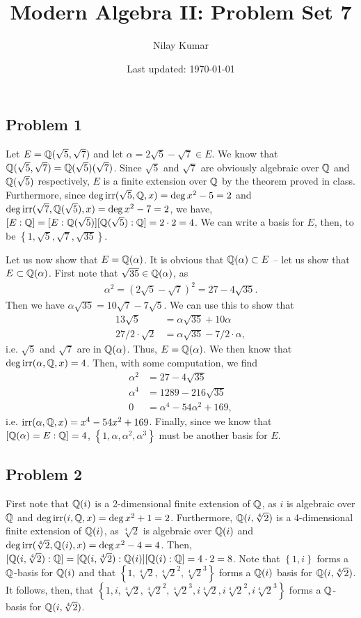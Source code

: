 \documentclass{../../mathnotes}
\title{Modern Algebra II: Problem Set 7}
\author{Nilay Kumar}
\date{Last updated: \today}
\begin{document}
\maketitle

\subsection*{Problem 1}

Let $E=\mathbb{Q}(\sqrt{5},\sqrt{7})$ and let $\alpha=2\sqrt{5}-\sqrt{7}\in E$. We know that $\mathbb{Q}(\sqrt{5},\sqrt{7})=\mathbb{Q}(\sqrt{5})(\sqrt{7})$.
Since $\sqrt{5}$ and $\sqrt{7}$ are obviously algebraic over $\mathbb{Q}$ and $\mathbb{Q}(\sqrt{5})$ respectively, $E$ is a finite extension over
$\mathbb{Q}$ by the theorem proved in class. Furthermore, since $\deg\operatorname{irr}(\sqrt{5},\mathbb{Q},x)=\deg x^2-5=2$ and $\deg\operatorname{irr}(\sqrt{7},\mathbb{Q}(\sqrt{5}),x)=\deg x^2-7=2$,
we have, $[E:\mathbb{Q}]=[E:\mathbb{Q}(\sqrt{5})][\mathbb{Q}(\sqrt{5}):\mathbb{Q}]=2\cdot2=4$. We can write a basis for $E$, then, to be $\left\{1,\sqrt{5},\sqrt{7},\sqrt{35}\right\}$.

Let us now show that $E=\mathbb{Q}(\alpha)$. It is obvious that $\mathbb{Q}(\alpha)\subset E$ -- let us show that $E\subset \mathbb{Q}(\alpha)$. First note that
$\sqrt{35}\in\mathbb{Q}(\alpha)$, as
\begin{align*}
    \alpha^2=(2\sqrt{5}-\sqrt{7})^2=27-4\sqrt{35}.
\end{align*}
Then we have $\alpha\sqrt{35}=10\sqrt{7}-7\sqrt{5}$. We can use this to show that
\begin{align*}
    13\sqrt{5}&=\alpha\sqrt{35}+10\alpha\\
    27/2\cdot\sqrt{2}&=\alpha\sqrt{35}-7/2\cdot\alpha,
\end{align*}
i.e. $\sqrt{5}$ and $\sqrt{7}$ are in $\mathbb{Q}(\alpha)$. Thus, $E=\mathbb{Q}(\alpha)$. We then know that $\deg\operatorname{irr}(\alpha,\mathbb{Q},x)=4$. Then, with some computation,
we find
\begin{align*}
    \alpha^2&=27-4\sqrt{35}\\
    \alpha^4&=1289-216\sqrt{35}\\
    0&=\alpha^4-54\alpha^2+169,
\end{align*}
i.e. $\operatorname{irr}(\alpha,\mathbb{Q},x)=x^4-54x^2+169$. Finally, since we know that $[\mathbb{Q}(\alpha)=E:\mathbb{Q}]=4$, $\left\{ 1,\alpha,\alpha^2,\alpha^3 \right\}$ must
be another basis for $E$.

\subsection*{Problem 2}

First note that $\mathbb{Q}(i)$ is a 2-dimensional finite extension of $\mathbb{Q}$, as $i$ is algebraic over $\mathbb{Q}$ and $\deg\operatorname{irr}(i,\mathbb{Q},x)=\deg x^2+1=2$.
Furthermore, $\mathbb{Q}(i,\sqrt[4]{2})$ is a 4-dimensional finite extension of $\mathbb{Q}(i)$, as $\sqrt[4]{2}$ is algebraic over $\mathbb{Q}(i)$ and
$\deg\operatorname{irr}(\sqrt[4]{2},\mathbb{Q}(i),x)=\deg x^2-4=4$. Then, $[\mathbb{Q}(i,\sqrt[4]{2}):\mathbb{Q}]=[\mathbb{Q}(i,\sqrt[4]{2}):\mathbb{Q}(i)][\mathbb{Q}(i):\mathbb{Q}]=4\cdot2=8$.
Note that $\left\{ 1,i \right\}$ forms a $\mathbb{Q}$-basis for $\mathbb{Q}(i)$ and that $\left\{ 1,\sqrt[4]{2},\sqrt[4]{2}^2, \sqrt[4]{2}^3 \right\}$
forms a $\mathbb{Q}(i)$ basis for $\mathbb{Q}(i,\sqrt[4]{2})$. It follows, then, that $\left\{ 1,i, \sqrt[4]{2},\sqrt[4]{2}^2, \sqrt[4]{2}^3,
i\sqrt[4]{2},i\sqrt[4]{2}^2,i\sqrt[4]{2}^3\right\}$ forms a $\mathbb{Q}$-basis for $\mathbb{Q}(i,\sqrt[4]{2})$.
\end{document}
